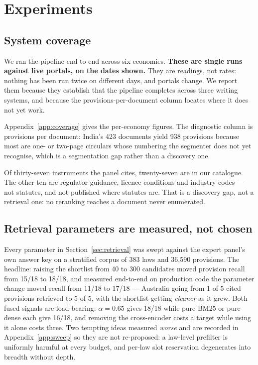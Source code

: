 \documentclass{article}
\begin{document}
\section{Experiments}
\label{sec:experiments}

\subsection{System coverage}
\label{sec:coverage}

We ran the pipeline end to end across six economies.
\textbf{These are single runs against live portals, on the dates shown.} They are
readings, not rates: nothing has been run twice on different days, and portals
change. We report them because they establish that the pipeline completes across
three writing systems, and because the provisions-per-document column locates
where it does not yet work.

Appendix~\ref{app:coverage} gives the per-economy figures. The diagnostic column
is provisions per document: India's 423 documents yield 938 provisions because
most are one- or two-page circulars whose numbering the segmenter does not yet
recognise, which is a segmentation gap rather than a discovery one.

Of thirty-seven instruments the panel cites, twenty-seven are in our catalogue.
The other ten are regulator guidance, licence conditions and industry codes ---
not statutes, and not published where statutes are. That is a discovery gap, not
a retrieval one: no reranking reaches a document never enumerated.

\subsection{Retrieval parameters are measured, not chosen}
\label{sec:sweep}

Every parameter in Section~\ref{sec:retrieval} was swept against the expert
panel's own answer key on a stratified corpus of 383 laws and 36{,}590
provisions. The headline: raising the shortlist from 40 to 300 candidates moved
provision recall from 15/18 to 18/18, and measured end-to-end on production code
the parameter change moved recall from 11/18 to 17/18 --- Australia going from 1
of 5 cited provisions retrieved to 5 of 5, with the shortlist getting
\emph{cleaner} as it grew. Both fused signals are load-bearing: $\alpha=0.65$
gives 18/18 while pure BM25 or pure dense each give 16/18, and removing the
cross-encoder costs a target while using it alone costs three. Two tempting ideas
measured \emph{worse} and are recorded in Appendix~\ref{app:sweep} so they are
not re-proposed: a law-level prefilter is uniformly harmful at every budget, and
per-law slot reservation degenerates into breadth without depth.
\end{document}
